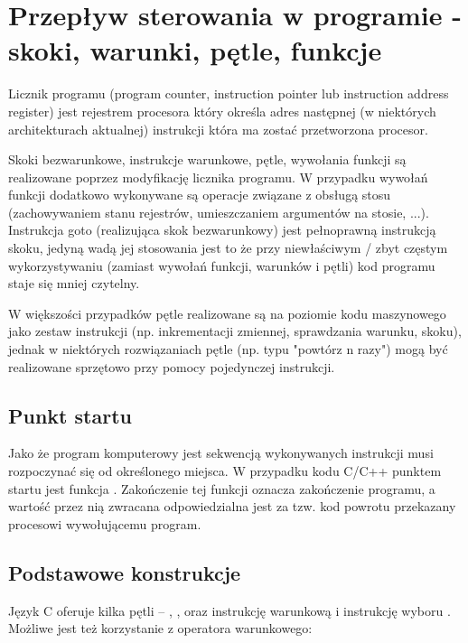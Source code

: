 \section{Przepływ sterowania w programie - skoki, warunki, pętle, funkcje}

Licznik programu (program counter, instruction pointer lub instruction address register) jest rejestrem procesora który określa adres następnej (w niektórych architekturach aktualnej) instrukcji która ma zostać przetworzona procesor.

Skoki bezwarunkowe, instrukcje warunkowe, pętle, wywołania funkcji są realizowane poprzez modyfikację licznika programu. W przypadku wywołań funkcji dodatkowo wykonywane są operacje związane z obsługą stosu (zachowywaniem stanu rejestrów, umieszczaniem argumentów na stosie, ...). Instrukcja goto (realizująca skok bezwarunkowy) jest pełnoprawną instrukcją skoku, jedyną wadą jej stosowania jest to że przy niewłaściwym / zbyt częstym wykorzystywaniu (zamiast wywołań funkcji, warunków i pętli) kod programu staje się mniej czytelny.

W większości przypadków pętle realizowane są na poziomie kodu maszynowego jako zestaw instrukcji (np. inkrementacji zmiennej, sprawdzania warunku, skoku), jednak w niektórych rozwiązaniach pętle (np. typu "powtórz n razy") mogą być realizowane sprzętowo przy pomocy pojedynczej instrukcji.

\subsection{Punkt startu}

Jako że program komputerowy jest sekwencją wykonywanych instrukcji musi rozpoczynać się od określonego miejsca.
W przypadku kodu C/C++ punktem startu jest funkcja . Zakończenie tej funkcji oznacza zakończenie programu, a wartość przez nią zwracana odpowiedzialna jest za tzw. kod powrotu przekazany procesowi wywołującemu program. 


\subsection{Podstawowe konstrukcje}

Język C oferuje kilka pętli – , ,  oraz instrukcję warunkową  i instrukcję wyboru .
Możliwe jest też korzystanie z operatora warunkowego:

